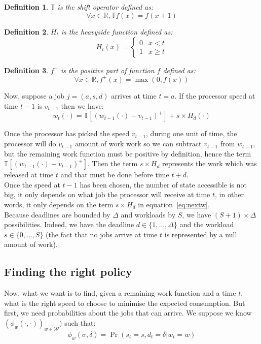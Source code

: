 \documentclass[
10pt, %
a4paper, %
oneside, %
headinclude,footinclude, %
BCOR5mm, %
]{scrartcl}
\newcommand{\T}{\mathbb{T}}
\newcommand{\W}{\mathcal{W}}
\newcommand{\R}{\mathbb{R}}
\newtheorem{defi}{Definition}
\begin{document}
\begin{defi}
  $\T$ is the shift operator defined as:
  \[ \forall x\in\R,\T f(x) = f(x+1)\]
\end{defi}

\begin{defi}
  $H_t$ is the heavyside function defined as:
  \[ H_t(x) =
    \begin{cases}
      0 & x<t \\
      1 & x\geq t
    \end{cases}
  \]
\end{defi}

\begin{defi}
  $f^+$ is the positive part of function $f$ defined as:
  \[
    \forall x\in\R, f^+(x)=\max(0,f(x))
  \]
\end{defi}

Now, suppose a job $j=(a,s,d)$ arrives at time $t=a$. If the processor
speed at time $t-1$ is $v_{t-1}$ then we have:
\begin{equation}
  \label{eq:nextw}
  w_t(\cdot)=\T[(w_{t-1}(\cdot)-v_{t-1})^+]+s\times H_d(\cdot)
\end{equation}

Once the processor has picked the speed $v_{t-1}$, during one unit of time,
the processor will do $v_{t-1}$ amount of work work so we can
subtract $v_{t-1}$ from
$w_{t-1}$, but the remaining work function must be positive by
definition, hence the term $\T[(w_{t-1}(\cdot)-v_{t-1})^+]$. Then the
term $s\times H_d$ represents the work which was released at time
$t$ and that must be done before time $t+d$.\\

Once the speed at $t-1$ has been chosen, the number of state
accessible is not big, it only depends on what job the processor will
receive at time $t$, in other words, it only depends on the term
$s\times H_d$ in equation~\ref{eq:nextw}.\\

Because deadlines are bounded by $\Delta$ and
workloads by $S$, we have $(S+1)\times\Delta$ possibilities. Indeed, we
have the deadline $d\in\{1,\dots, \Delta\}$ and the workload
$s\in\{0,\dots, S\}$ (the fact that no jobs arrive at time $t$ is
represented by a null amount of work).

\subsection{Finding the right policy}
Now, what we want is to find, given a remaining work function and a
time $t$, what is the right speed to choose to minimise the expected
consumption. But first, we need probabilities about the jobs that can
arrive. We suppose we know $(\phi_w(\cdot,\cdot))_{w\in\W})$ such that:
\begin{equation}
  \label{eq:prob}
  \phi_w(\sigma, \delta)=\Pr(s_t=s,d_t=\delta|w_t=w)
\end{equation}
\end{document}
